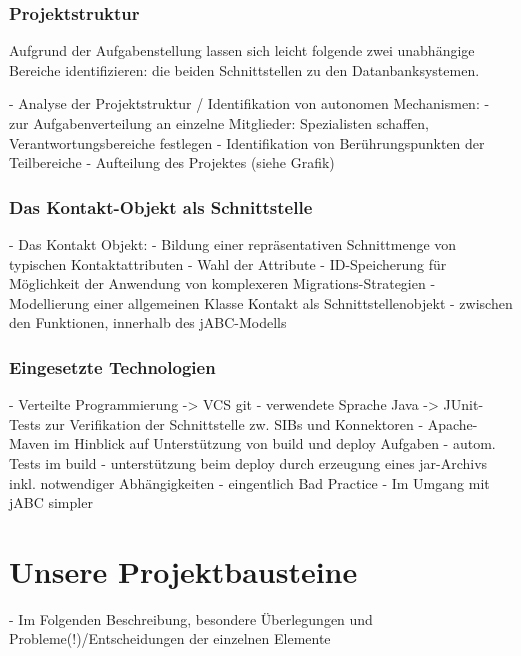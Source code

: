 \subsubsection{Projektstruktur}
Aufgrund der Aufgabenstellung lassen sich leicht folgende zwei unabhängige Bereiche identifizieren: die beiden Schnittstellen zu den Datanbanksystemen. 

- Analyse der Projektstruktur / Identifikation von autonomen Mechanismen:
	- zur Aufgabenverteilung an einzelne Mitglieder: Spezialisten schaffen, Verantwortungsbereiche festlegen
	- Identifikation von Berührungspunkten der Teilbereiche
	- Aufteilung des Projektes (siehe Grafik)
	
\subsubsection{Das Kontakt-Objekt als Schnittstelle}
- Das Kontakt Objekt:
	- Bildung einer repräsentativen Schnittmenge von typischen Kontaktattributen
		- Wahl der Attribute
		- ID-Speicherung für Möglichkeit der Anwendung von komplexeren Migrations-Strategien
	- Modellierung einer allgemeinen Klasse Kontakt als Schnittstellenobjekt
		- zwischen den Funktionen, innerhalb des jABC-Modells
		
\subsubsection{Eingesetzte Technologien}
- Verteilte Programmierung -> VCS git
- verwendete Sprache Java -> JUnit-Tests zur Verifikation der Schnittstelle zw. SIBs und Konnektoren
- Apache-Maven im Hinblick auf Unterstützung von build und deploy Aufgaben
	- autom. Tests im build
	- unterstützung beim deploy durch erzeugung eines jar-Archivs inkl. notwendiger Abhängigkeiten
		- eingentlich Bad Practice
		- Im Umgang mit jABC simpler


\section{Unsere Projektbausteine}
 - Im Folgenden Beschreibung, besondere Überlegungen und Probleme(!)/Entscheidungen der einzelnen Elemente

